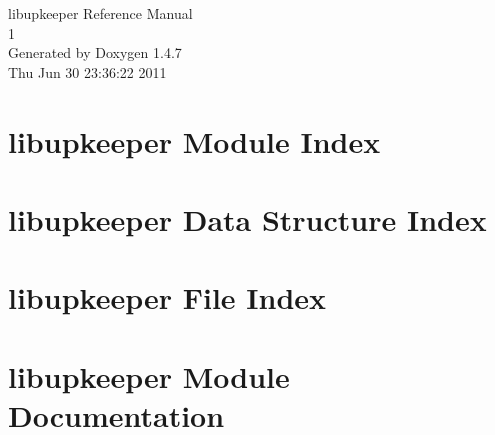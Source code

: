 \documentclass[a4paper]{book}
\begin{document}
\begin{titlepage}
\vspace*{7cm}
\begin{center}
{\Large libupkeeper Reference Manual\\[1ex]\large 1 }\\
\vspace*{1cm}
{\large Generated by Doxygen 1.4.7}\\
\vspace*{0.5cm}
{\small Thu Jun 30 23:36:22 2011}\\
\end{center}
\end{titlepage}
\clearemptydoublepage
{}
\tableofcontents
\clearemptydoublepage
{}
\chapter{libupkeeper Module Index}

\chapter{libupkeeper Data Structure Index}

\chapter{libupkeeper File Index}

\chapter{libupkeeper Module Documentation}







\end{document}
